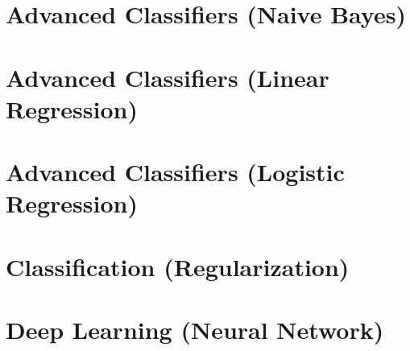 \documentclass{notesclass}
\begin{document}
\chapter{Advanced Classifiers (Naive Bayes)}


\chapter{Advanced Classifiers (Linear Regression)}


\chapter{Advanced Classifiers (Logistic Regression)}


\chapter{Classification (Regularization)}


\chapter{Deep Learning (Neural Network)}




\end{document}
